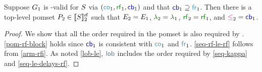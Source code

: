 
\begin{theorem}
  \label{thm:ec}
  Suppose $G_1$ %
  is \EC-valid for $S$ via $({\rco_1}, {\rrfx_1}, {\rcb_1})$ and that
  ${\rcb_1}\supseteq{\rfr_1}$.  Then there is a top-level pomset
  $\aPS_2\in\frf{\semrr{\aCmd}}$ such that $E_2=E_1$,
  $\labeling_2=\labeling_1$, ${\rrfx_2}={\rrfx_1}$, and ${\le_2}={\rcb_1}$.

  \vspace{-.5\baselineskip}
  \begin{proof}
    We show that all the order required in the pomset is also required by
    \armeight{}.  \ref{pom-rf-block} holds since ${\rcb_1}$ is consistent with
    ${\rco_1}$ and ${\rfr_1}$.  \ref{seq-rf-le-rf} follows from \ref{arm-rfi}.
    As noted \ref{lob-le}, $\rlob$ includes the order required by
    \ref{seq-kappa} and \ref{seq-le-delays-rf}.  
  \end{proof}
\end{theorem}


